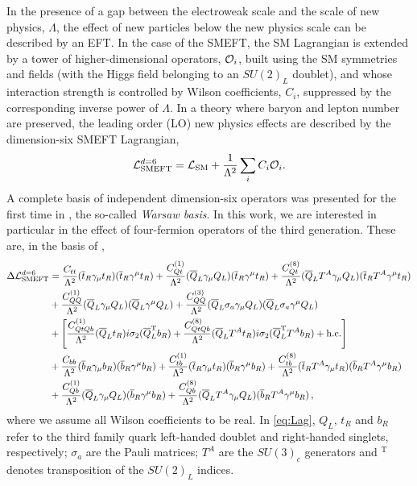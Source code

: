 In the presence of a gap between the electroweak scale and the scale of new physics, $\Lambda$, the effect of new particles below the new physics scale can be described by an EFT. In the case of the SMEFT, the SM Lagrangian is extended by a tower of higher-dimensional operators, ${\cal O}_i$, built using the SM symmetries and fields (with the Higgs field belonging to an $SU(2)_L$ doublet), and whose interaction strength is controlled by Wilson coefficients, $C_i$, suppressed by the corresponding inverse power of $\Lambda$. In a theory where baryon and lepton number are preserved, the leading order (LO) new physics effects are described by the dimension-six  SMEFT Lagrangian,
%
\begin{equation}
	\mathcal{L}_{\mathrm{SMEFT}}^{d=6}=\mathcal{L}_{\mathrm{SM}} + \frac{1}{\Lambda^2}\sum_i C_i  {\cal O}_i.
\end{equation}
%
A complete basis of independent dimension-six operators was presented for the first time in \cite{Grzadkowski:2010es}, the so-called \textit{ Warsaw basis}. In this work, we are interested in particular in the effect of four-fermion operators of the third generation. %
These are, in the basis of \cite{Grzadkowski:2010es}, 
%
\begin{align}
	\Delta \mathcal{L}_{\mathrm{SMEFT}}^{d=6}&=\frac{C_{tt}}{\Lambda^2}(\overline{t}_R \gamma_{\mu} t_R)(\overline{t}_R \gamma^{\mu} t_R)+\frac{C_{Qt}^{(1)}}{\Lambda^2}(\overline{Q}_L \gamma_{\mu} Q_L)(\overline{t}_R \gamma^{\mu} t_R)+\frac{C_{Qt}^{(8)}}{\Lambda^2}(\overline{Q}_L T^A\gamma_{\mu} Q_L)(\overline{t}_R T^A\gamma^{\mu} t_R) \nonumber\\ \label{eq:Lag}
	&+\frac{C_{QQ}^{(1)}}{\Lambda^2}(\overline{Q}_L \gamma_{\mu} Q_L)(\overline{Q}_L \gamma^{\mu} Q_L)+\frac{C_{QQ}^{(3)}}{\Lambda^2}(\overline{Q}_L \sigma_a \gamma_{\mu} Q_L)(\overline{Q}_L  \sigma_a \gamma^{\mu} Q_L)\\ &+\left[\frac{C^{(1)}_{QtQb}}{\Lambda^2} (\overline{Q}_L t_R )i\sigma_2(\overline{Q}_L^\mathrm{ T} b_R) +\frac{C^{(8)}_{QtQb}}{\Lambda^2} (\overline{Q}_L T^A t_R) i\sigma_2 (\overline{Q}_L^{\mathrm {T}} T^A b_R) + \mathrm{h.c.} \right]\,\nonumber
	\\
	&+ \frac{C_{bb}}{\Lambda^2}(\overline{b}_R \gamma_{\mu} b_R)(\overline{b}_R \gamma^{\mu} b_R) +\frac{C_{tb}^{(1)}}{\Lambda^2}(\overline{t}_R \gamma_{\mu} t_R)(\overline{b}_R \gamma^{\mu} b_R)+\frac{C_{tb}^{(8)}}{\Lambda^2}(\overline{t}_R T^A\gamma_{\mu} t_R)(\overline{b}_R T^A\gamma^{\mu} b_R) \nonumber \\
	& +\frac{C_{Qb}^{(1)}}{\Lambda^2}(\overline{Q}_L \gamma_{\mu} Q_L)(\overline{b}_R \gamma^{\mu} b_R)+\frac{C_{Qb}^{(8)}}{\Lambda^2}(\overline{Q}_L T^A\gamma_{\mu} Q_L)(\overline{b}_R T^A\gamma^{\mu} b_R) \,,\nonumber
\end{align}
%
where we assume all Wilson coefficients to be real. In \eqref{eq:Lag}, $Q_L$, $t_R$ and $b_R$ refer to the third family quark left-handed doublet and right-handed singlets, respectively; $\sigma_{a}$ are the Pauli matrices; $T^{A}$ are the $SU(3)_c$ generators and ${}^{\mathrm{T}}$ denotes transposition of the $SU(2)_L$ indices.

